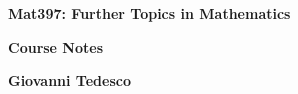 \documentclass[a4paper]{article}
\begin{document}
  \begin{titlepage}
   \begin{center}
       \vspace*{1cm}
       {\huge
       \textbf{Mat397: Further Topics in Mathematics}}\

       \vspace{1.5cm}

       {\large
       \textbf{Course Notes}}

       \vspace{0.8cm}
       \textbf{Giovanni Tedesco}
       \vspace{0.8cm}
   \end{center}
  \end{titlepage}
  \tableofcontents
  \newpage

  
  \newpage
  
  \newpage
  
  \newpage
  
  \newpage
  \appendix
  

  
\end{document}

